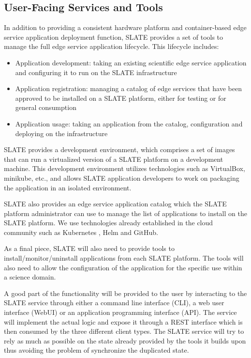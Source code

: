 \documentclass[sigconf]{acmart}
\begin{document}
\subsection{User-Facing Services and Tools}

In addition to providing a consistent hardware platform and container-based edge service application deployment function, SLATE provides a set of tools to manage the full edge service application lifecycle. This lifecycle includes:
\begin{itemize}
    \item{Application development: taking an existing scientific edge service application and configuring it to run on the SLATE infrastructure}
    \item{Application registration: managing a catalog of edge services that have been approved to be installed on a SLATE platform, either for testing or for general consumption}
    \item{Application usage: taking an application from the catalog, configuration and deploying on the infrastructure}
\end{itemize}

SLATE provides a development environment, which comprises a set of images that can run a virtualized version of a SLATE platform on a development machine. This development environment utilizes technologies such as VirtualBox, minikube, etc., and allows SLATE application developers to work on packaging the application in an isolated environment. 

SLATE also provides an edge service application catalog which the SLATE platform administrator can use to manage the list of applications to install on the SLATE platform.  We use technologies already established in the cloud community such as Kubernetes \cite{Kubernetes1,Kubernetes2}, Helm\cite{Helm} and GitHub\cite{Github}.

As a final piece, SLATE will also need to provide tools to install/monitor/uninstall applications from each SLATE platform. The tools will also need to allow the configuration of the application for the specific use within a science domain.

A good part of the functionality will be provided to the user by interacting to the SLATE service through either a command line interface (CLI), a web user interface (WebUI) or an application programming interface (API). The service will implement the actual logic and expose it through a REST interface which is then consumed by the three different client types. The SLATE service will try to rely as much as possible on the state already provided by the tools it builds upon thus avoiding the problem of synchronize the duplicated state.
\end{document}
